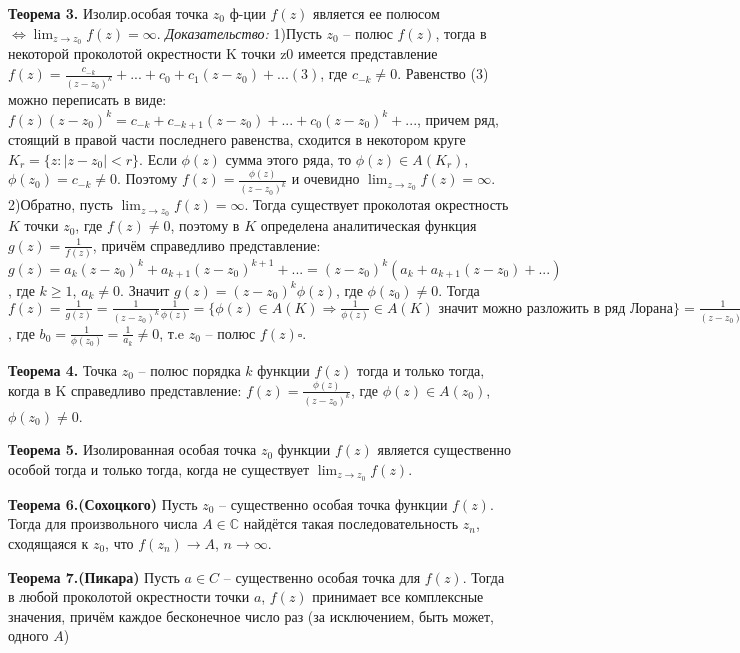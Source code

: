\textbf{Теорема 3.} Изолир.особая точка $z_0$ ф-ции $f(z)$ является ее полюсом $\Longleftrightarrow \displaystyle\lim_{z\rightarrow z_0}f(z)=\infty$.
\textit{Доказательство:}
    1)Пусть $z_0$ – полюс $f(z)$, тогда в некоторой проколотой окрестности K точки z0 имеется представление $f(z)=\frac{c_{-k}}{(z-z_0)^k}+...+c_0+c_1(z-z_0)+...(3)$,
    где $c_{-k}\neq0$. Равенство (3) можно переписать в виде:
    $f(z)(z-z_0)^k=c_{-k}+c_{-k+1}(z-z_0)+...+c_0(z-z_0)^k+...$, причем ряд, стоящий в правой части последнего равенства, сходится в некотором круге $K_r=\{z:|z-z_0|<r\}$. Если $\phi(z)$ сумма этого ряда, то $\phi(z) \in A(K_r)$, $\phi(z_0)=c_{-k}\neq0$. Поэтому $f(z)=\frac{\phi(z)}{(z-z_0)^k}$ и очевидно $\displaystyle\lim_{z\rightarrow z_0}f(z)=\infty$.
    2)Обратно, пусть $\displaystyle\lim_{z\rightarrow z_0}f(z)=\infty$. Тогда существует
    проколотая окрестность $K$ точки $z_0$, где $f(z) \neq 0$, поэтому
    в $K$ определена аналитическая функция $g(z) = \frac{1}{f(z)}$, причём справедливо представление: $g(z)=a_k(z-z_0)^k+a_{k+1}(z-z_0)^{k+1}+...=(z-z_0)^k(a_k+a_{k+1}(z-z_0)+...)$, где $k\geq1$, $a_k\neq0$. Значит $g(z)=(z-z_0)^k\phi(z)$, где $\phi(z_0)\neq0$. Тогда $f(z)=\frac{1}{g(z)}=\frac{1}{(z-z_0)^k}\frac{1}{\phi(z)}=\{\phi(z) \in A(K) \Rightarrow \frac{1}{\phi(z)} \in A(K) \text{ значит можно разложить в ряд Лорана}\}=
    \frac{1}{(z-z_0)^k}(b_0+b_1(z-z_0)+...)$, где $b_0=\frac{1}{\phi(z_0)}=\frac{1}{a_k}\neq0$, т.e $z_0$ -- полюс $f(z) \square$.


\textbf{Теорема 4.} Точка $z_0$ – полюс порядка $k$ функции $f(z)$ тогда и только тогда, когда в K справедливо представление: $f(z)=\frac{\phi(z)}{(z-z_0)^k}$, где $\phi(z)\in A(z_0)$, $\phi(z_0)\neq 0$.

\textbf{Теорема 5.} Изолированная особая точка $z_0$ функции
 $f(z)$ является существенно особой тогда и только тогда,
когда не существует $\displaystyle\lim_{z\rightarrow z_0}f(z)$.

\textbf{Теорема 6.(Сохоцкого)} Пусть $z_0$ – существенно особая точка функции $f(z)$. Тогда
для произвольного числа $A \in \mathbb{C}$ найдётся такая последовательность ${z_n}$, сходящаяся к $z_0$, что $f(z_n)\rightarrow A$, $n \rightarrow \infty$.

\textbf{Теорема 7.(Пикара)} Пусть $a \in C$ – существенно особая точка для $f(z)$. Тогда в любой проколотой окрестности
точки $a$, $f(z)$ принимает все комплексные значения, причём каждое бесконечное число раз
(за исключением, быть может, одного $A$)

